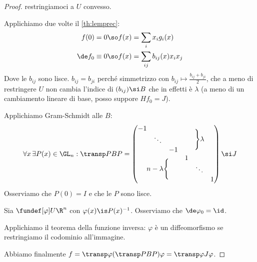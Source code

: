 \begin{proof}
	\wlg restringiamoci a $U$ convesso.
	
	Applichiamo due volte il \autoref{th:lemprec}:
	\begin{align*}
		f(0)=0 &\so f(x)=\sum_ix_ig_i(x) \\
		\de f_{0}\equiv0 &\so f(x)=\sum_{ij}b_{ij}(x)x_ix_j
	\end{align*}
	Dove le $b_{ij}$ sono lisce. \wlg $b_{ij}=b_{ji}$ perché simmetrizzo con $b_{ij}\mapsto\frac{b_{ij}+b_{ji}}2$, che a meno di restringere $U$ non cambia l'indice di $(b_{ij})\si B$ che in effetti è $\lambda$ (a meno di un cambiamento lineare di base, posso suppore $Hf_{0}=J$).
	
	Applichiamo Gram-Schmidt alle $B$:
	\[\forall x\,\exists P(x)\in\GL_n:
	\transp PBP=
	\begin{pmatrix}
		\begin{matrix}
			-1 & & \\
			& \ddots & \\
			& & -1 \\
		\end{matrix} & \Bigg\}\lambda \\
		n-\lambda\Bigg\{ & \begin{matrix}
			1 & & \\
			& \ddots & \\
			& & 1 \\
		\end{matrix}
	\end{pmatrix}\si J\]
	Osserviamo che $P(0)=I$ e che le $P$ sono lisce.
	
	Sia $\fundef[\varphi]U{\R^n}$ con $\varphi(x)\is P(x)^{-1}$. Osserviamo che $\de\varphi_{0}=\id$.
	
	Applichiamo il teorema della funzione inversa: $\varphi$ è un diffeomorfismo se restringiamo il codominio all'immagine.
	
	Abbiamo finalmente $f=\transp\varphi(\transp PBP)\varphi=\transp\varphi J\varphi$.
\end{proof}
